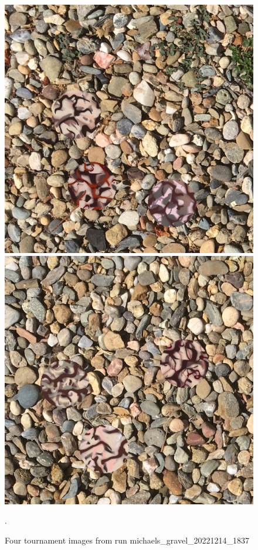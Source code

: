 \documentclass[acmtog]{acmart}
\begin{document}
\begin{figure}
    \hfill
    \includegraphics[scale=0.24]{20221215_step_6830.png}
    \hfill
    \includegraphics[scale=0.24]{20221215_step_6916.png}
    \caption{Four tournament images from run michaels\_gravel\_20221214\_1837}.
    \label{fig:michaels_gravel_4x}
\end{figure}
\end{document}
